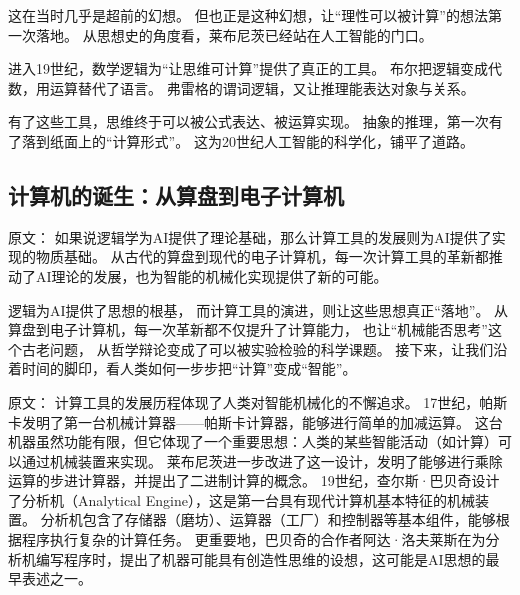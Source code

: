 这在当时几乎是超前的幻想。
但也正是这种幻想，让“理性可以被计算”的想法第一次落地。
从思想史的角度看，莱布尼茨已经站在人工智能的门口。



进入19世纪，数学逻辑为“让思维可计算”提供了真正的工具。
布尔把逻辑变成代数，用运算替代了语言。
弗雷格的谓词逻辑，又让推理能表达对象与关系。

有了这些工具，思维终于可以被公式表达、被运算实现。
抽象的推理，第一次有了落到纸面上的“计算形式”。
这为20世纪人工智能的科学化，铺平了道路。

\subsection{计算机的诞生：从算盘到电子计算机}

原文：
如果说逻辑学为AI提供了理论基础，那么计算工具的发展则为AI提供了实现的物质基础。
从古代的算盘到现代的电子计算机，每一次计算工具的革新都推动了AI理论的发展，也为智能的机械化实现提供了新的可能。


逻辑为AI提供了思想的根基，
而计算工具的演进，则让这些思想真正“落地”。
从算盘到电子计算机，每一次革新都不仅提升了计算能力，
也让“机械能否思考”这个古老问题，
从哲学辩论变成了可以被实验检验的科学课题。
接下来，让我们沿着时间的脚印，看人类如何一步步把“计算”变成“智能”。

原文：
计算工具的发展历程体现了人类对智能机械化的不懈追求。
17世纪，帕斯卡发明了第一台机械计算器——帕斯卡计算器，能够进行简单的加减运算。
这台机器虽然功能有限，但它体现了一个重要思想：人类的某些智能活动（如计算）可以通过机械装置来实现。
莱布尼茨进一步改进了这一设计，发明了能够进行乘除运算的步进计算器，并提出了二进制计算的概念。
19世纪，查尔斯·巴贝奇设计了分析机（Analytical Engine），这是第一台具有现代计算机基本特征的机械装置。
分析机包含了存储器（磨坊）、运算器（工厂）和控制器等基本组件，能够根据程序执行复杂的计算任务。
更重要地，巴贝奇的合作者阿达·洛夫莱斯在为分析机编写程序时，提出了机器可能具有创造性思维的设想，这可能是AI思想的最早表述之一。



